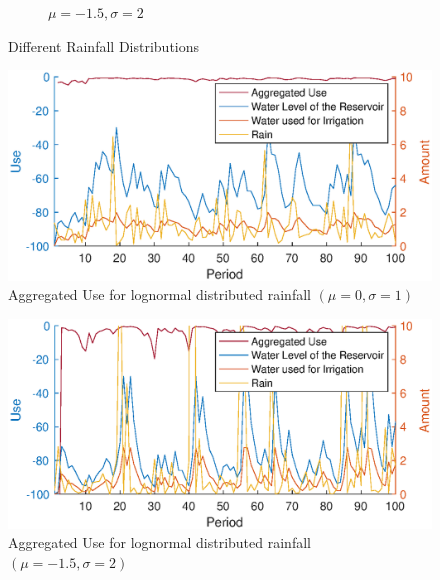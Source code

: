 \documentclass[12pt, a4paper, oneside]{article}
\begin{document}
\begin{figure}
\begin{subfigure}{.5\textwidth}
		\caption{$\mu=-1.5, \sigma=2$}
		\label{fig:rainfall-changed}
	\end{subfigure}
	\caption{Different Rainfall Distributions}
	\label{fig:rain-distributions}
\end{figure}
\newpage
\begin{figure}[ht]
	\includegraphics[width=1\textwidth]{figures/aggregated-use-rainfall-default.eps}
	\caption{Aggregated Use for lognormal distributed rainfall $(\mu=0, \sigma=1)$}
	\label{fig:aggregated-use-rainfall-default}
\end{figure}
\begin{figure}[ht]
\includegraphics[width=1\textwidth]{figures/aggregated-use-rainfall-more-volatile.eps}
\caption{Aggregated Use for lognormal distributed rainfall $(\mu=-1.5, \sigma=2)$}
\label{fig:aggregated-use-rainfall-more-volatile}
\end{figure}
\end{document}
